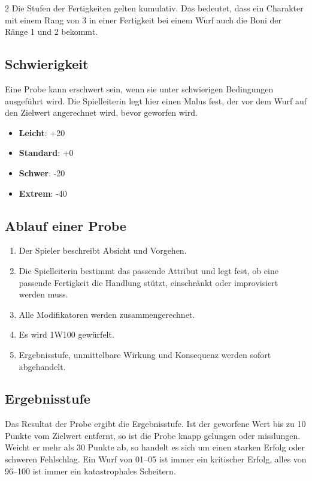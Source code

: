 \begin{multicols*}{2}
Die Stufen der Fertigkeiten gelten kumulativ. Das bedeutet, dass ein Charakter mit einem Rang von 3 in einer Fertigkeit bei einem Wurf auch die Boni der Ränge 1 und 2 bekommt.

\subsection{Schwierigkeit}

Eine Probe kann erschwert sein, wenn sie unter schwierigen Bedingungen ausgeführt wird.
Die Spielleiterin legt hier einen Malus fest, der vor dem Wurf auf den Zielwert angerechnet wird, bevor geworfen wird.

\begin{itemize}[leftmargin=*]
\item \textbf{Leicht}: +20
\item \textbf{Standard}: +0
\item \textbf{Schwer}: -20
\item \textbf{Extrem}: -40
\end{itemize}

\subsection{Ablauf einer Probe}

\begin{enumerate}[leftmargin=*]
\item Der Spieler beschreibt Absicht und Vorgehen.
\item Die Spielleiterin bestimmt das passende Attribut und legt fest, ob eine passende Fertigkeit die Handlung stützt, einschränkt oder improvisiert werden muss.
\item Alle Modifikatoren werden zusammengerechnet.
\item Es wird 1W100 gewürfelt.
\item Ergebnisstufe, unmittelbare Wirkung und Konsequenz werden sofort abgehandelt.
\end{enumerate}

\subsection{Ergebnisstufe}

Das Resultat der Probe ergibt die Ergebnisstufe.
Ist der geworfene Wert bis zu 10 Punkte vom Zielwert entfernt, so ist die Probe knapp gelungen oder misslungen.
Weicht er mehr als 30 Punkte ab, so handelt es sich um einen starken Erfolg oder schweren Fehlschlag.
Ein Wurf von 01--05 ist immer ein kritischer Erfolg, alles von 96--100 ist immer ein katastrophales Scheitern.


\end{multicols*}
